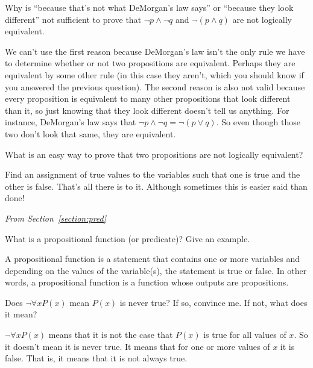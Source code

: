 \begin{requ}
Why is ``because that's not what DeMorgan's law says''
or ``because they look different'' not sufficient to prove that
$\neg p \wedge \neg q$ and $\neg(p\wedge q)$ are not logically equivalent.
\begin{requanswer}
We can't use the first reason because DeMorgan's law isn't the
only rule we have to determine whether or not two propositions
are equivalent. Perhaps they are equivalent by some other rule
(in this case they aren't, which you should know if you
answered the previous question).
The second reason is also not valid because 
every proposition is equivalent to many other 
propositions that look different than it, so just knowing that
they look different doesn't tell us anything. For instance,
DeMorgan's law says that $\neg p \wedge \neg q=\neg(p\vee q)$.
So even though those two don't look that same, they are equivalent.
\end{requanswer}
\end{requ}

\begin{requ}
What is an easy way to prove that two propositions are
not logically equivalent?
\begin{requanswer}
Find an assignment of true values to the variables
such that one is true and the other is false. That's all there is to it.
Although sometimes this is easier said than done!
\end{requanswer}
\end{requ}

\medskip

\noindent
{\em From Section~\ref{section:pred}}

\begin{requ}
What is a propositional function (or predicate)? Give an example.
\begin{requanswer}
A propositional function is a statement that contains one or more variables and depending on the values of the variable(s), 
the statement is true or false. In other words, a propositional function is a function whose outputs are propositions.
\end{requanswer}
\end{requ}

\begin{requ}
Does $\neg\forall x P(x)$ mean $P(x)$ is never true? If so, convince me. If not, what does it mean?
\begin{requanswer}
$\neg\forall x P(x)$ means that it is not the case that $P(x)$ is true for all values of $x$.
So it doesn't mean it is never true. It means that for one or more values of $x$ it is false.
That is, it means that it is not always true.
\end{requanswer}
\end{requ}

